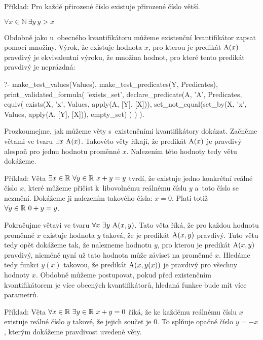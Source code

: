 Příklad: Pro každé přirozené číslo existuje přirozené číslo větší. 

\(\forall x \in \mathbb{N} \ \exists y \ y > x\)

Obdobně jako u~obecného kvantifikátoru můžeme existenční kvantifikátor zapsat pomocí množiny. Výrok, že existuje hodnota \(x\), pro kterou je predikát \(\mathrm{A}(x)\) pravdivý je ekvivalentní výroku, že množina hodnot, pro které tento predikát pravdivý je neprázdná:

\begin{prolog}
?- 	make_test_values(Values),
	make_test_predicates(Y, Predicates),
	print_validated_formula(
		'exists_set',
		declare_predicate(A, 'A', Predicates,
			equiv(
				exists(X, 'x', Values, apply(A, [Y], [X])),
				set_not_equal(set_by(X, 'x', Values, apply(A, [Y], [X])), empty_set)
			)
		)
	).
\end{prolog}

Prozkoumejme, jak můžeme věty s~existenčními kvantifikátory dokázat. Začněme větami ve tvaru \(\exists x \ \predicate{A}(x)\). Takovéto věty říkají, že predikát \(\mathrm{A}(x)\) je pravdivý alespoň pro jednu hodnotu proměnné \(x\).  Nalezením této hodnoty tedy větu dokážeme.

Příklad: Věta \(\exists x \in \real \ \forall y \in \real \ x + y = y\) tvrdí, že existuje jedno konkrétní reálné číslo \(x\), které můžeme přičíst k~libovolnému reálnému číslu \(y\) a~toto číslo se nezmění. Dokážeme ji nalezením takového čísla: \(x = 0\). Platí totiž \(\forall y \in \mathbb{R} \ 0 + y = y\).

Pokračujme větavi ve tvaru \(\forall x \ \exists y \ \predicate{A}(x, y)\). Tato věta říká, že pro každou hodnotu proměnné \(x\) existuje hodnota \(y\) taková, že je predikát \(\mathrm{A}(x, y)\) pravdivý. Tuto větu tedy opět dokážeme tak, že nalezneme hodnotu \(y\), pro kterou je predikát \(\mathrm{A}(x, y)\) pravdivý, nicméně nyní už tato hodnota může záviset na proměnné \(x\). Hledáme tedy funkci \(y(x)\) takovou, že predikát \(\mathrm{A}(x, y(x))\) je pravdivý pro všechny hodnoty \(x\). Obdobně můžeme postupovat, pokud před existenčním kvantifikátorem je více obecných kvantifikátorů, hledaná funkce bude mít více parametrů.

Příklad: Věta \(\forall x \in \real \ \exists y \in \real \ x + y = 0\) říká, že ke každému reálnému číslu \(x\) existuje reálné číslo \(y\) takové, že jejich součet je 0. To splňuje opačné číslo \(y = -x\), kterým dokážeme pravdivost uvedené věty.

